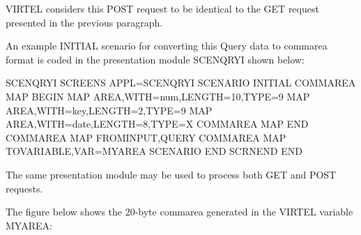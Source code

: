 \documentclass[letterpaper,10pt,english]{sphinxmanual}
\begin{document}
VIRTEL considers this POST request to be identical to the GET request presented in the previous paragraph.


An example INITIAL scenario for converting this Query data to commarea format is coded in the presentation module SCENQRYI shown below:

\begin{sphinxVerbatim}[commandchars=\\\{\}]
SCENQRYI SCREENS APPL=SCENQRYI
         SCENARIO INITIAL
COMMAREA MAP\PYGZdl{} BEGIN
         MAP\PYGZdl{} AREA,WITH=\PYGZsq{}num\PYGZsq{},LENGTH=10,TYPE=9
         MAP\PYGZdl{} AREA,WITH=\PYGZsq{}key\PYGZsq{},LENGTH=2,TYPE=9
         MAP\PYGZdl{} AREA,WITH=\PYGZsq{}date\PYGZsq{},LENGTH=8,TYPE=X
COMMAREA MAP\PYGZdl{} END
COMMAREA MAP\PYGZdl{} FROM\PYGZhy{}INPUT,QUERY
COMMAREA MAP\PYGZdl{} TO\PYGZhy{}VARIABLE,VAR=\PYGZsq{}MYAREA\PYGZsq{}
         SCENARIO END
         SCRNEND
         END
\end{sphinxVerbatim}


The same presentation module may be used to process both GET and POST requests.


The figure below shows the 20-byte commarea generated in the VIRTEL variable MYAREA:

\begin{sphinxVerbatim}[commandchars=\\\{\}]
\end{sphinxVerbatim}


\end{document}
